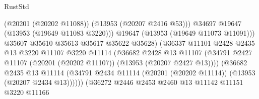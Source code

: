 \begin{lexlean}{RustStd}
\begin{coremodule}
                                                (@20201 (@20202 @11088))
                                                (@13953 (@20207 @2416 @53)))
                                              @34697
                                              @19647
                                              (@13953 (@19649 @11083 @3220)))
                                            @19647
                                            (@13953 (@19649 @11073 @11091)))
                                          @35607
                                          @35610
                                          @35613
                                          @35617
                                          @35622
                                          @35628)
                                        (@36337
                                          @11101
                                          @2428
                                          @2435
                                          @13
                                          @3220
                                          @11107
                                          @3220
                                          @11114
                                          (@36682
                                            @2428
                                            @13
                                            @11107
                                            (@34791
                                              @2427
                                              @11107
                                              (@20201 (@20202 @11107))
                                              (@13953 (@20207 @2427 @13))))
                                          (@36682
                                            @2435
                                            @13
                                            @11114
                                            (@34791
                                              @2434
                                              @11114
                                              (@20201 (@20202 @11114))
                                              (@13953 (@20207 @2434 @13))))))
                                      (@36272
                                        @2446
                                        @2453
                                        @2460
                                        @13
                                        @11142
                                        @11151
                                        @3220
                                        @11166

\end{coremodule}
\end{lexlean}
